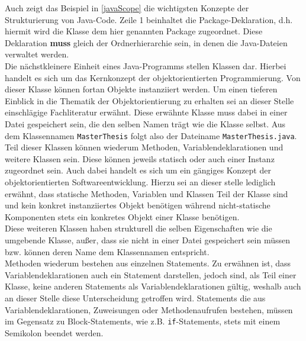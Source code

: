 Auch zeigt das Beispiel in \autoref{javaScope} die wichtigsten Konzepte der Strukturierung von Java-Code. Zeile 1 beinhaltet die Package-Deklaration, d.h. hiermit wird die Klasse dem hier genannten Package zugeordnet. Diese Deklaration \textbf{muss} gleich der Ordnerhierarchie sein, in denen die Java-Dateien verwaltet werden. \\

Die nächstkleinere Einheit eines Java-Programms stellen Klassen dar. Hierbei handelt es sich um das Kernkonzept der objektorientierten Programmierung. Von dieser Klasse können fortan Objekte instanziiert werden. Um einen tieferen Einblick in die Thematik der Objektorientierung zu erhalten sei an dieser Stelle einschlägige Fachliteratur erwähnt. Diese erwähnte Klasse muss dabei in einer Datei gespeichert sein, die den selben Namen trägt wie die Klasse selbst. Aus dem Klassennamen \texttt{MasterThesis} folgt also der Dateiname \texttt{MasterThesis.java}.\\

Teil dieser Klassen können wiederum Methoden, Variablendeklarationen und weitere Klassen sein. Diese können jeweils statisch oder auch einer Instanz zugeordnet sein. Auch dabei handelt es sich um ein gängiges Konzept der objektorientierten Softwareentwicklung. Hierzu sei an dieser stelle lediglich erwähnt, dass statische Methoden, Variablen und Klassen Teil der Klasse sind und kein konkret instanziiertes Objekt benötigen während nicht-statische Komponenten stets ein konkretes Objekt einer Klasse benötigen.\\

Diese weiteren Klassen haben strukturell die selben Eigenschaften wie die umgebende Klasse, außer, dass sie nicht in einer Datei gespeichert sein müssen bzw. können deren Name dem Klassennamen entspricht.\\



Methoden wiederum bestehen aus einzelnen Statements. Zu erwähnen ist, dass Variablendeklarationen auch ein Statement darstellen, jedoch sind, als Teil einer Klasse, keine anderen Statements als Variablendeklarationen gültig, weshalb auch an dieser Stelle diese Unterscheidung getroffen wird. Statements die aus Variablendeklarationen, Zuweisungen oder Methodenaufrufen bestehen, müssen im Gegensatz zu Block-Statements, wie z.B. \texttt{if}-Statements, stets mit einem Semikolon beendet werden. \\

